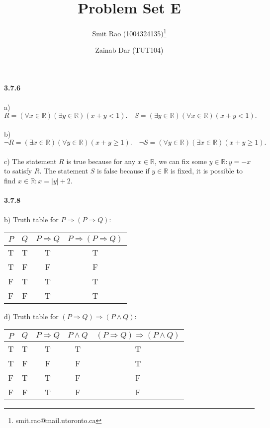 \documentclass[12pt]{article}
\begin{document}
\parindent=0pt
\title{Problem Set E}
\author{Smit Rao (1004324135)\thanks{smit.rao@mail.utoronto.ca} 
\and Zainab Dar (TUT104)}
\maketitle
\textbf{3.7.6}\\\\
a) 
$R = (\forall x \in \mathbb{R})(\exists y \in \mathbb{R})(x+y<1).\quad S = (\exists y \in \mathbb{R})(\forall x \in \mathbb{R})(x+y<1).$\\\\
b) 
$\neg R = (\exists x \in \mathbb{R})(\forall y \in \mathbb{R})(x+y \geq 1).\quad \neg S = (\forall y \in \mathbb{R})(\exists x \in \mathbb{R})(x+y \geq 1).$\\\\
c) The statement $R$ is true because for any $x \in \mathbb{R}$, we can fix some $y \in \mathbb{R} : y = -x$ to satisfy $R$. 
The statement $S$ is false because if $y \in \mathbb{R}$ is fixed, it is possible to find $x \in \mathbb{R} : x = |y| + 2$.\\\\
\textbf{3.7.8}\\\\
b)
Truth table for $P \Rightarrow (P \Rightarrow Q)$:\\
\begin{center}
\begin{tabular}{|c|c|c|c|}
\hline
$P$ & $Q$ & $P \Rightarrow Q$ & $P \Rightarrow (P \Rightarrow Q)$\\
\hline
T & T & T & T\\
T & F & F & F\\
F & T & T & T\\
F & F & T & T\\
\hline
\end{tabular}
\end{center}
\newpage
d)
Truth table for $(P \Rightarrow Q) \Rightarrow (P \land Q)$:\\
\begin{center}
\begin{tabular}{|c|c|c|c|c|}
\hline
$P$ & $Q$ & $P \Rightarrow Q$ & $P \land Q$ & $(P \Rightarrow Q) \Rightarrow (P \land Q)$\\
\hline
T & T & T & T & T\\
T & F & F & F & T\\
F & T & T & F & F\\
F & F & T & F & F\\
\hline
\end{tabular}
\end{center}
\end{document}
